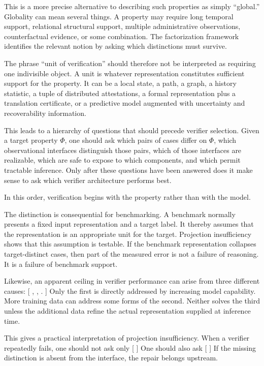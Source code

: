 \documentclass[11pt]{article}
\begin{document}
This is a more precise alternative to describing such properties as simply ``global.'' Globality can mean several things. A property may require long temporal support, relational structural support, multiple administrative observations, counterfactual evidence, or some combination. The factorization framework identifies the relevant notion by asking which distinctions must survive.

The phrase ``unit of verification'' should therefore not be interpreted as requiring one indivisible object. A unit is whatever representation constitutes sufficient support for the property. It can be a local state, a path, a graph, a history statistic, a tuple of distributed attestations, a formal representation plus a translation certificate, or a predictive model augmented with uncertainty and recoverability information.

This leads to a hierarchy of questions that should precede verifier selection. Given a target property $\Phi$, one should ask which pairs of cases differ on $\Phi$, which observational interfaces distinguish those pairs, which of those interfaces are realizable, which are safe to expose to which components, and which permit tractable inference. Only after these questions have been answered does it make sense to ask which verifier architecture performs best.

In this order, verification begins with the property rather than with the model.

The distinction is consequential for benchmarking. A benchmark normally presents a fixed input representation and a target label. It thereby assumes that the representation is an appropriate unit for the target. Projection insufficiency shows that this assumption is testable. If the benchmark representation collapses target-distinct cases, then part of the measured error is not a failure of reasoning. It is a failure of benchmark support.

Likewise, an apparent ceiling in verifier performance can arise from three different causes:
[
,
\qquad
{},
\qquad
{}.
]
Only the first is directly addressed by increasing model capability. More training data can address some forms of the second. Neither solves the third unless the additional data refine the actual representation supplied at inference time.

This gives a practical interpretation of projection insufficiency. When a verifier repeatedly fails, one should not ask only
[
]
One should also ask
[
]
If the missing distinction is absent from the interface, the repair belongs upstream.
\end{document}

